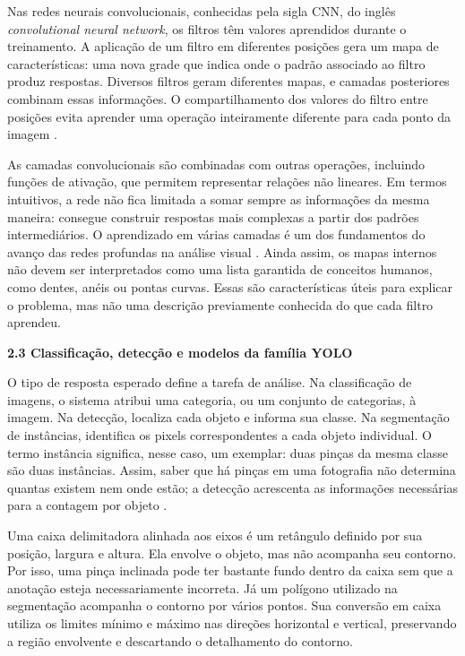 Nas redes neurais convolucionais, conhecidas pela sigla CNN, do inglês \textit{convolutional neural network}, os filtros têm valores aprendidos durante o treinamento. A aplicação de um filtro em diferentes posições gera um mapa de características: uma nova grade que indica onde o padrão associado ao filtro produz respostas. Diversos filtros geram diferentes mapas, e camadas posteriores combinam essas informações. O compartilhamento dos valores do filtro entre posições evita aprender uma operação inteiramente diferente para cada ponto da imagem \parencite{goodfellow2016}.

As camadas convolucionais são combinadas com outras operações, incluindo funções de ativação, que permitem representar relações não lineares. Em termos intuitivos, a rede não fica limitada a somar sempre as informações da mesma maneira: consegue construir respostas mais complexas a partir dos padrões intermediários. O aprendizado em várias camadas é um dos fundamentos do avanço das redes profundas na análise visual \parencite{lecun2015}. Ainda assim, os mapas internos não devem ser interpretados como uma lista garantida de conceitos humanos, como dentes, anéis ou pontas curvas. Essas são características úteis para explicar o problema, mas não uma descrição previamente conhecida do que cada filtro aprendeu.

\vspace{\baselineskip}
{}
\noindent\textbf{2.3 Classificação, detecção e modelos da família YOLO}\par
\vspace{\baselineskip}

O tipo de resposta esperado define a tarefa de análise. Na classificação de imagens, o sistema atribui uma categoria, ou um conjunto de categorias, à imagem. Na detecção, localiza cada objeto e informa sua classe. Na segmentação de instâncias, identifica os pixels correspondentes a cada objeto individual. O termo instância significa, nesse caso, um exemplar: duas pinças da mesma classe são duas instâncias. Assim, saber que há pinças em uma fotografia não determina quantas existem nem onde estão; a detecção acrescenta as informações necessárias para a contagem por objeto \parencite{padilla2021}.

Uma caixa delimitadora alinhada aos eixos é um retângulo definido por sua posição, largura e altura. Ela envolve o objeto, mas não acompanha seu contorno. Por isso, uma pinça inclinada pode ter bastante fundo dentro da caixa sem que a anotação esteja necessariamente incorreta. Já um polígono utilizado na segmentação acompanha o contorno por vários pontos. Sua conversão em caixa utiliza os limites mínimo e máximo nas direções horizontal e vertical, preservando a região envolvente e descartando o detalhamento do contorno.

